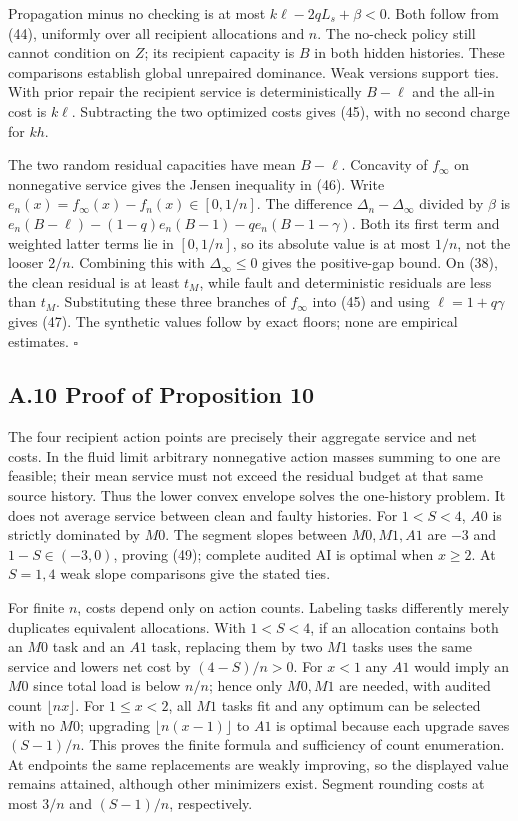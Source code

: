 \documentclass[
  11pt,
  a4paper,
]{article}
\begin{document}
Propagation minus no checking is at most \(k\ell-2qL_s+\beta<0\). Both
follow from (44), uniformly over all recipient allocations and \(n\).
The no-check policy still cannot condition on \(Z\); its recipient
capacity is \(B\) in both hidden histories. These comparisons establish
global unrepaired dominance. Weak versions support ties. With prior
repair the recipient service is deterministically \(B-\ell\) and the
all-in cost is \(k\ell\). Subtracting the two optimized costs gives
(45), with no second charge for \(kh\).

The two random residual capacities have mean \(B-\ell\). Concavity of
\(f_\infty\) on nonnegative service gives the Jensen inequality in (46).
Write \(e_n(x)=f_\infty(x)-f_n(x)\in[0,1/n]\). The difference
\(\Delta_n-\Delta_\infty\) divided by \(\beta\) is
\(e_n(B-\ell)-(1-q)e_n(B-1)-qe_n(B-1-\gamma)\). Both its first term and
weighted latter terms lie in \([0,1/n]\), so its absolute value is at
most \(1/n\), not the looser \(2/n\). Combining this with
\(\Delta_\infty\leq0\) gives the positive-gap bound. On (38), the clean
residual is at least \(t_M\), while fault and deterministic residuals
are less than \(t_M\). Substituting these three branches of \(f_\infty\)
into (45) and using \(\ell=1+q\gamma\) gives (47). The synthetic values
follow by exact floors; none are empirical estimates. \(\square\)

\hypertarget{a.10-proof-of-proposition-10}{%
\subsection{A.10 Proof of Proposition
10}\label{a.10-proof-of-proposition-10}}

The four recipient action points are precisely their aggregate service
and net costs. In the fluid limit arbitrary nonnegative action masses
summing to one are feasible; their mean service must not exceed the
residual budget at that same source history. Thus the lower convex
envelope solves the one-history problem. It does not average service
between clean and faulty histories. For \(1<S<4\), \(A0\) is strictly
dominated by \(M0\). The segment slopes between \(M0,M1,A1\) are \(-3\)
and \(1-S\in(-3,0)\), proving (49); complete audited AI is optimal when
\(x\geq2\). At \(S=1,4\) weak slope comparisons give the stated ties.

For finite \(n\), costs depend only on action counts. Labeling tasks
differently merely duplicates equivalent allocations. With \(1<S<4\), if
an allocation contains both an \(M0\) task and an \(A1\) task, replacing
them by two \(M1\) tasks uses the same service and lowers net cost by
\((4-S)/n>0\). For \(x<1\) any \(A1\) would imply an \(M0\) since total
load is below \(n/n\); hence only \(M0,M1\) are needed, with audited
count \(\lfloor nx\rfloor\). For \(1\leq x<2\), all \(M1\) tasks fit and
any optimum can be selected with no \(M0\); upgrading
\(\lfloor n(x-1)\rfloor\) to \(A1\) is optimal because each upgrade
saves \((S-1)/n\). This proves the finite formula and sufficiency of
count enumeration. At endpoints the same replacements are weakly
improving, so the displayed value remains attained, although other
minimizers exist. Segment rounding costs at most \(3/n\) and
\((S-1)/n\), respectively.
\end{document}
